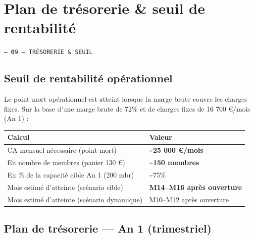 \documentclass[11pt, a4paper]{article}
\newcommand{\eyebrow}[1]{%
  \vspace{4pt}
  {\small\color{fc-ink3}\texttt{— #1}}
  \vspace{2pt}
}
\newcommand{\redcell}[1]{\textcolor{fc-red}{\textbf{#1}}}
\begin{document}
\section{Plan de trésorerie \& seuil de rentabilité}
\eyebrow{09 — TRÉSORERIE \& SEUIL}

\subsection{Seuil de rentabilité opérationnel}

Le point mort opérationnel est atteint lorsque la marge brute couvre les charges fixes. Sur la base d'une marge brute de 72\% et de charges fixes de 16 700 €/mois (An 1) :

\begin{center}
\begin{tabular}{@{}p{8cm}p{4.5cm}@{}}
\toprule
\rowcolor{fc-ink}\color{white}\textbf{Calcul} & \color{white}\textbf{Valeur} \\
\midrule
CA mensuel nécessaire (point mort) & \redcell{\textasciitilde25 000 €/mois} \\
\rowcolor{fc-bg2} En nombre de membres (panier 130 €) & \redcell{\textasciitilde150 membres} \\
En \% de la capacité cible An 1 (200 mbr) & \textasciitilde75\% \\
\rowcolor{fc-bg2} Mois estimé d'atteinte (scénario cible) & \redcell{M14–M16 après ouverture} \\
Mois estimé d'atteinte (scénario dynamique) & M10–M12 après ouverture \\
\bottomrule
\end{tabular}
\end{center}

\subsection{Plan de trésorerie — An 1 (trimestriel)}
\end{document}
